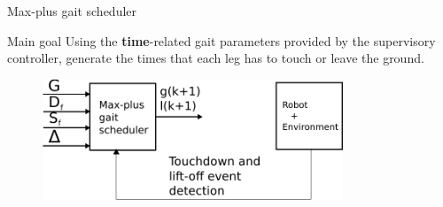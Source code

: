\documentclass[10pt]{beamer}
\begin{document}
\begin{frame}{Max-plus gait scheduler}
	\begin{block}{Main goal}
		\Large Using the \textbf{time}-related gait parameters provided by the supervisory controller, generate the times that each leg has to touch or leave the ground.
	\end{block}
	\begin{figure}[ht]\centering
		\includegraphics[width=0.8\textwidth]{images/MaxPlus.pdf}
	\end{figure}
\end{frame}
\end{document}
